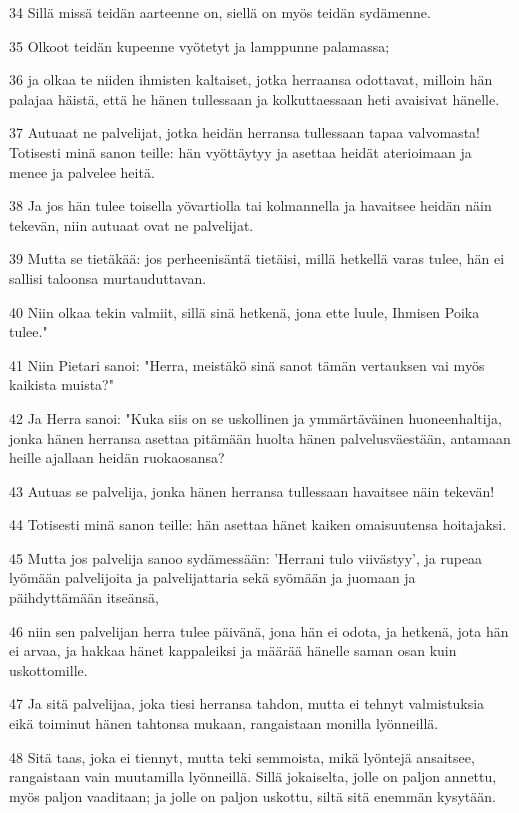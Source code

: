 \par 34 Sillä missä teidän aarteenne on, siellä on myös teidän sydämenne.
\par 35 Olkoot teidän kupeenne vyötetyt ja lamppunne palamassa;
\par 36 ja olkaa te niiden ihmisten kaltaiset, jotka herraansa odottavat, milloin hän palajaa häistä, että he hänen tullessaan ja kolkuttaessaan heti avaisivat hänelle.
\par 37 Autuaat ne palvelijat, jotka heidän herransa tullessaan tapaa valvomasta! Totisesti minä sanon teille: hän vyöttäytyy ja asettaa heidät aterioimaan ja menee ja palvelee heitä.
\par 38 Ja jos hän tulee toisella yövartiolla tai kolmannella ja havaitsee heidän näin tekevän, niin autuaat ovat ne palvelijat.
\par 39 Mutta se tietäkää: jos perheenisäntä tietäisi, millä hetkellä varas tulee, hän ei sallisi taloonsa murtauduttavan.
\par 40 Niin olkaa tekin valmiit, sillä sinä hetkenä, jona ette luule, Ihmisen Poika tulee."
\par 41 Niin Pietari sanoi: "Herra, meistäkö sinä sanot tämän vertauksen vai myös kaikista muista?"
\par 42 Ja Herra sanoi: "Kuka siis on se uskollinen ja ymmärtäväinen huoneenhaltija, jonka hänen herransa asettaa pitämään huolta hänen palvelusväestään, antamaan heille ajallaan heidän ruokaosansa?
\par 43 Autuas se palvelija, jonka hänen herransa tullessaan havaitsee näin tekevän!
\par 44 Totisesti minä sanon teille: hän asettaa hänet kaiken omaisuutensa hoitajaksi.
\par 45 Mutta jos palvelija sanoo sydämessään: 'Herrani tulo viivästyy', ja rupeaa lyömään palvelijoita ja palvelijattaria sekä syömään ja juomaan ja päihdyttämään itseänsä,
\par 46 niin sen palvelijan herra tulee päivänä, jona hän ei odota, ja hetkenä, jota hän ei arvaa, ja hakkaa hänet kappaleiksi ja määrää hänelle saman osan kuin uskottomille.
\par 47 Ja sitä palvelijaa, joka tiesi herransa tahdon, mutta ei tehnyt valmistuksia eikä toiminut hänen tahtonsa mukaan, rangaistaan monilla lyönneillä.
\par 48 Sitä taas, joka ei tiennyt, mutta teki semmoista, mikä lyöntejä ansaitsee, rangaistaan vain muutamilla lyönneillä. Sillä jokaiselta, jolle on paljon annettu, myös paljon vaaditaan; ja jolle on paljon uskottu, siltä sitä enemmän kysytään.
